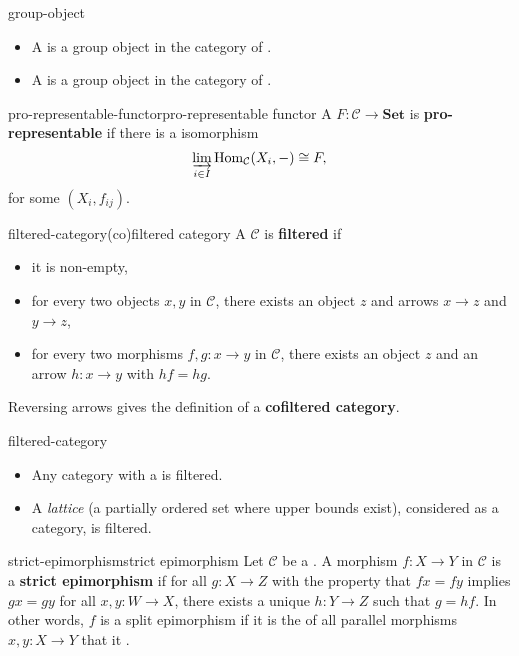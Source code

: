 \begin{example}{group-object}
    \begin{itemize}
        \item A  is a group object in the category of .
        \item A  is a group object in the category of .
    \end{itemize}
\end{example}

\begin{topic}{pro-representable-functor}{pro-representable functor}
    A  $F : \mathcal{C} \to \textbf{Set}$ is \textbf{pro-representable} if there is a  isomorphism
    \[ \varinjlim_{i \in I} \operatorname{Hom}_\mathcal{C}(X_i, -) \cong F , \]
    for some  $(X_i, f_{ij})$.
\end{topic}

\begin{topic}{filtered-category}{(co)filtered category}
    A  $\mathcal{C}$ is \textbf{filtered} if
    \begin{itemize}
        \item it is non-empty,
        \item for every two objects $x, y$ in $\mathcal{C}$, there exists an object $z$ and arrows $x \to z$ and $y \to z$,
        \item for every two morphisms $f, g : x \to y$ in $\mathcal{C}$, there exists an object $z$ and an arrow $h : x \to y$ with $hf = hg$.
    \end{itemize}
    Reversing arrows gives the definition of a \textbf{cofiltered category}.
\end{topic}

\begin{example}{filtered-category}
    \begin{itemize}
        \item Any category with a  is filtered.
        \item A \textit{lattice} (a partially ordered set where upper bounds exist), considered as a category, is filtered.
    \end{itemize}
\end{example}

\begin{topic}{strict-epimorphism}{strict epimorphism}
    Let $\mathcal{C}$ be a . A morphism $f : X \to Y$ in $\mathcal{C}$ is a \textbf{strict epimorphism} if for all $g : X \to Z$ with the property that $fx = fy$ implies $gx = gy$ for all $x, y : W \to X$, there exists a unique $h : Y \to Z$ such that $g = hf$. In other words, $f$ is a split epimorphism if it is the  of all parallel morphisms $x, y : X \to Y$ that it .
\end{topic}

